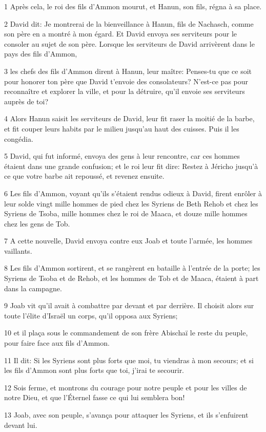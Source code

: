 \par 1 Après cela, le roi des fils d'Ammon mourut, et Hanun, son fils, régna à sa place.
\par 2 David dit: Je montrerai de la bienveillance à Hanun, fils de Nachasch, comme son père en a montré à mon égard. Et David envoya ses serviteurs pour le consoler au sujet de son père. Lorsque les serviteurs de David arrivèrent dans le pays des fils d'Ammon,
\par 3 les chefs des fils d'Ammon dirent à Hanun, leur maître: Penses-tu que ce soit pour honorer ton père que David t'envoie des consolateurs? N'est-ce pas pour reconnaître et explorer la ville, et pour la détruire, qu'il envoie ses serviteurs auprès de toi?
\par 4 Alors Hanun saisit les serviteurs de David, leur fit raser la moitié de la barbe, et fit couper leurs habits par le milieu jusqu'au haut des cuisses. Puis il les congédia.
\par 5 David, qui fut informé, envoya des gens à leur rencontre, car ces hommes étaient dans une grande confusion; et le roi leur fit dire: Restez à Jéricho jusqu'à ce que votre barbe ait repoussé, et revenez ensuite.
\par 6 Les fils d'Ammon, voyant qu'ils s'étaient rendus odieux à David, firent enrôler à leur solde vingt mille hommes de pied chez les Syriens de Beth Rehob et chez les Syriens de Tsoba, mille hommes chez le roi de Maaca, et douze mille hommes chez les gens de Tob.
\par 7 A cette nouvelle, David envoya contre eux Joab et toute l'armée, les hommes vaillants.
\par 8 Les fils d'Ammon sortirent, et se rangèrent en bataille à l'entrée de la porte; les Syriens de Tsoba et de Rehob, et les hommes de Tob et de Maaca, étaient à part dans la campagne.
\par 9 Joab vit qu'il avait à combattre par devant et par derrière. Il choisit alors sur toute l'élite d'Israël un corps, qu'il opposa aux Syriens;
\par 10 et il plaça sous le commandement de son frère Abischaï le reste du peuple, pour faire face aux fils d'Ammon.
\par 11 Il dit: Si les Syriens sont plus forts que moi, tu viendras à mon secours; et si les fils d'Ammon sont plus forts que toi, j'irai te secourir.
\par 12 Sois ferme, et montrons du courage pour notre peuple et pour les villes de notre Dieu, et que l'Éternel fasse ce qui lui semblera bon!
\par 13 Joab, avec son peuple, s'avança pour attaquer les Syriens, et ils s'enfuirent devant lui.
